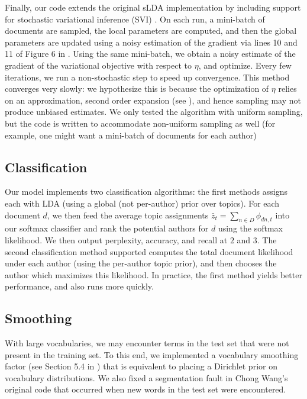 \documentclass[14pt]{article} %
\theoremstyle{plain}
\theoremstyle{definition}
\theoremstyle{remark}
\begin{document}
\begin{appendix}
Finally, our code extends the original sLDA implementation by including support for stochastic variational inference (SVI) \cite{hoffman2013stochastic}. On each run, a mini-batch of documents are sampled, the local parameters are computed, and then the global parameters are updated using a noisy estimation of the gradient via lines 10 and 11 of Figure 6 in  \cite{hoffman2013stochastic}. Using the same mini-batch, we obtain a noisy estimate of the gradient of the variational objective with respect to $\eta$, and optimize. Every few iterations, we run a non-stochastic step to speed up convergence. This method converges very slowly: we hypothesize this is because the optimization of $\eta$ relies on an approximation, second order expansion (see \cite{wang2009simultaneous}), and hence sampling may not produce unbiased estimates. We only tested the algorithm with uniform sampling, but the code is written to accommodate non-uniform sampling as well (for example, one might want a mini-batch of documents for each author)


\subsection{Classification}
\label{appendix:classification}

Our model implements two classification algorithms: the first methods assigns each with LDA (using a global (not per-author) prior over topics). For each document $d$, we then feed the average topic assignments $\bar{z}_{t}=\sum_{n\in D}\phi_{dn,t}$ into our softmax classifier and rank the potential authors for $d$ using the softmax likelihood. We then output perplexity, accuracy, and recall at $2$ and $3$. The second classification method supported computes the total document likelihood under each author (using the per-author topic prior), and then chooses the author which maximizes this likelihood. In practice, the first method yields better performance, and also runs more quickly.
 
\subsection{Smoothing}
\label{appendix:smoothing}
With large vocabularies, we may encounter terms in the test set that were not present in the training set. To this end, we implemented a vocabulary smoothing factor (see Section 5.4 in \cite{Blei2003}) that is equivalent to placing a Dirichlet prior on vocabulary distributions. We also fixed a segmentation fault in Chong Wang's original code that occurred when new words in the test set were encountered.


\end{appendix}
\end{document}
